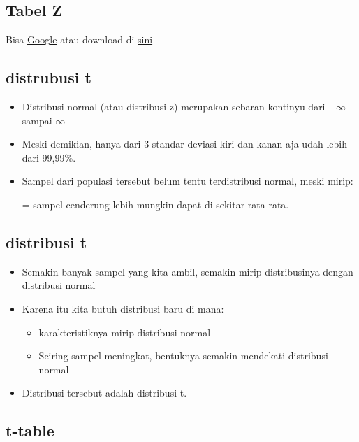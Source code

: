 \documentclass[
  letterpaper,
  DIV=11,
  numbers=noendperiod]{scrartcl}
\begin{document}
\hypertarget{tabel-z}{%
\subsection{Tabel Z}\label{tabel-z}}

Bisa
\href{https://www.google.com/search?client=firefox-b-d\&q=z+score+table}{Google}
atau download di
\href{https://drive.google.com/file/d/1ywI58hnM8p0ZyFV7B9rCOosk72iCGguq/view?usp=sharing}{sini}

\hypertarget{distrubusi-t}{%
\subsection{distrubusi t}\label{distrubusi-t}}

\begin{itemize}
\item
  Distribusi normal (atau distribusi z) merupakan sebaran kontinyu dari
  \(-\infty\) sampai \(\infty\)
\item
  Meski demikian, hanya dari 3 standar deviasi kiri dan kanan aja udah
  lebih dari 99,99\%.
\item
  Sampel dari populasi tersebut belum tentu terdistribusi normal, meski
  mirip:

  = sampel cenderung lebih mungkin dapat di sekitar rata-rata.
\end{itemize}

\hypertarget{distribusi-t}{%
\subsection{distribusi t}\label{distribusi-t}}

\begin{itemize}
\item
  Semakin banyak sampel yang kita ambil, semakin mirip distribusinya
  dengan distribusi normal
\item
  Karena itu kita butuh distribusi baru di mana:

  \begin{itemize}
  \item
    karakteristiknya mirip distribusi normal
  \item
    Seiring sampel meningkat, bentuknya semakin mendekati distribusi
    normal
  \end{itemize}
\item
  Distribusi tersebut adalah distribusi t.
\end{itemize}

\hypertarget{t-table}{%
\subsection{t-table}\label{t-table}}
\end{document}
